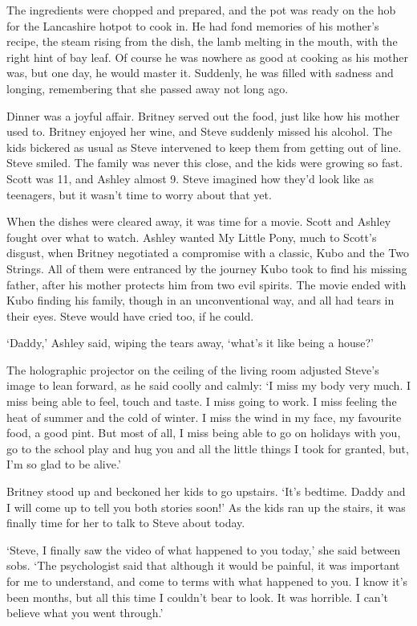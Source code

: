 The ingredients were chopped and prepared, and the pot was ready on the hob for the Lancashire hotpot to cook in. He had fond memories of his mother's recipe, the steam rising from the dish, the lamb melting in the mouth, with the right hint of bay leaf. Of course he was nowhere as good at cooking as his mother was, but one day, he would master it. Suddenly, he was filled with sadness and longing, remembering that she passed away not long ago.

Dinner was a joyful affair. Britney served out the food, just like how his mother used to. Britney enjoyed her wine, and Steve suddenly missed his alcohol. The kids bickered as usual as Steve intervened to keep them from getting out of line. Steve smiled. The family was never this close, and the kids were growing so fast. Scott was 11, and Ashley almost 9. Steve imagined how they'd look like as teenagers, but it wasn't time to worry about that yet.

When the dishes were cleared away, it was time for a movie. Scott and Ashley fought over what to watch. Ashley wanted My Little Pony, much to Scott's disgust, when Britney negotiated a compromise with a classic, Kubo and the Two Strings. All of them were entranced by the journey Kubo took to find his missing father, after his mother protects him from two evil spirits. The movie ended with Kubo finding his family, though in an unconventional way, and all had tears in their eyes. Steve would have cried too, if he could.

`Daddy,' Ashley said, wiping the tears away, `what's it like being a house?'

The holographic projector on the ceiling of the living room adjusted Steve's image to lean forward, as he said coolly and calmly: `I miss my body very much. I miss being able to feel, touch and taste. I miss going to work. I miss feeling the heat of summer and the cold of winter. I miss the wind in my face, my favourite food, a good pint. But most of all, I miss being able to go on holidays with you, go to the school play and hug you and all the little things I took for granted, but, I'm so glad to be alive.'

Britney stood up and beckoned her kids to go upstairs. `It's bedtime. Daddy and I will come up to tell you both stories soon!' As the kids ran up the stairs, it was finally time for her to talk to Steve about today.

`Steve, I finally saw the video of what happened to you today,' she said between sobs. `The psychologist said that although it would be painful, it was important for me to understand, and come to terms with what happened to you. I know it's been months, but all this time I couldn't bear to look. It was horrible. I can't believe what you went through.'

